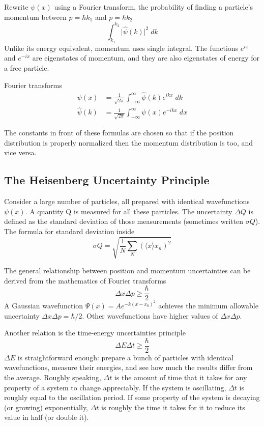 \documentclass[../../main.tex]{subfiles}
\begin{document}
Rewrite $\psi(x)$ using a Fourier transform, the probability of finding a particle's momentum between $p = \hbar k_1$ and $p = \hbar k_2$
\begin{equation*}
    \int_{k_1}^{k_2} \big| \hat{\psi}(k) \Big|^2\;dk
\end{equation*}
Unlike its energy equivalent, momentum uses single integral. The functions $e^{ix}$ and $e^{-ix}$ are eigenstates of momentum, and they are also eigenstates of energy for a free particle. 

Fourier transforms
\begin{align*}
    \psi(x)&= \frac{1}{\sqrt{2\pi}} \int_{-\infty}^{\infty}\hat{\psi}(k) e^{ikx}\;dk\\
    \hat{\psi}(k)&= \frac{1}{\sqrt{2\pi}} \int_{-\infty}^{\infty}\psi(x) e^{-ikx}\;dx
\end{align*}

The constants in front of these formulas are chosen so that if the position distribution is properly normalized then the momentum distribution is too, and vice versa.

\subsection{The Heisenberg Uncertainty Principle}
Consider a large number of particles, all prepared with identical wavefunctions $\psi (x)$. A quantity Q is measured for all these particles. The uncertainty $\Delta Q$ is defined as the standard deviation of those measurements (sometimes written $\sigma Q$). The formula for standard deviation inside
\begin{equation*}
    \sigma Q=\sqrt{\frac{1}{N}\sum_{N}^{}(\langle x\rangle x_n)^2}
\end{equation*}

The general relationship between position and momentum uncertainties can be derived from
the mathematics of Fourier transforms
\begin{equation*}
    \Delta x \Delta p \geq \frac{\hbar}{2}
\end{equation*}
A Gaussian wavefunction $\Psi (x) = A e^{-k(x-x_0)^2}$ achieves the minimum allowable uncertainty $\Delta x \Delta p = \hbar/2$. Other wavefunctions have higher values of $\Delta x \Delta p$.

Another relation is the time-energy uncertainties principle
\begin{equation*}
    \Delta E \Delta t \geq \frac{\hbar}{2}
\end{equation*}
$\Delta E$ is straightforward enough: prepare a bunch of particles with identical wavefunctions, measure their energies, and see how much the results differ from the average. Roughly speaking, $\Delta t$ is the amount of time that it takes for any property of a system to change appreciably. If the system is oscillating, $\Delta t$ is roughly equal to the oscillation period. If some property of the system is decaying (or growing) exponentially, $\Delta t$ is roughly the time it takes for it to reduce its value in half (or double it).
\end{document}
